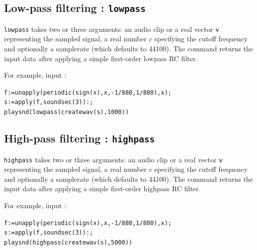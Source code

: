 \documentclass[a4paper,11pt]{book}
\begin{document}
\subsection{Low-pass filtering : {\tt lowpass}}
{\tt lowpass} takes two or three arguments: an audio clip or a real vector $ \mathbf{v} $ representing the sampled signal, a real number $ c $ specifying the cutoff frequency and optionally a samplerate (which defaults to 44100). The command returns the input data after applying a simple first-order lowpass RC filter.

For example, input :
\begin{center}
	{\tt f:=unapply(periodic(sign(x),x,-1/880,1/880),x);\\
		s:=apply(f,soundsec(3)):;\\
		playsnd(lowpass(createwav(s),1000))}
\end{center}

\subsection{High-pass filtering : {\tt highpass}}
{\tt highpass} takes two or three arguments: an audio clip or a real vector $ \mathbf{v} $ representing the sampled signal, a real number $ c $ specifying the cutoff frequency and optionally a samplerate (which defaults to 44100). The command returns the input data after applying a simple first-order highpass RC filter.

For example, input :
\begin{center}
	{\tt f:=unapply(periodic(sign(x),x,-1/880,1/880),x);\\
		s:=apply(f,soundsec(3)):;\\
		playsnd(highpass(createwav(s),5000))}
\end{center}
\end{document}
